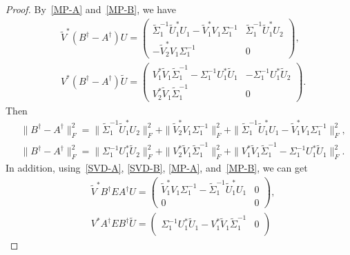 \documentclass[11pt]{article}
\begin{document}
\begin{proof}
By~\eqref{MP-A} and~\eqref{MP-B}, we have
\begin{align*}
&\widetilde{V}^{\ast}(B^{\dagger}-A^{\dagger})U=\begin{pmatrix}
\widetilde{\Sigma}_{1}^{-1}\widetilde{U}_{1}^{\ast}U_{1}-\widetilde{V}_{1}^{\ast}V_{1}\Sigma_{1}^{-1} & \widetilde{\Sigma}_{1}^{-1}\widetilde{U}_{1}^{\ast}U_{2} \\
-\widetilde{V}_{2}^{\ast}V_{1}\Sigma_{1}^{-1} & 0
\end{pmatrix},\\
&V^{\ast}(B^{\dagger}-A^{\dagger})\widetilde{U}=\begin{pmatrix}
V_{1}^{\ast}\widetilde{V}_{1}\widetilde{\Sigma}_{1}^{-1}-\Sigma_{1}^{-1}U_{1}^{\ast}\widetilde{U}_{1} & -\Sigma_{1}^{-1}U_{1}^{\ast}\widetilde{U}_{2} \\
V_{2}^{\ast}\widetilde{V}_{1}\widetilde{\Sigma}_{1}^{-1}  & 0
\end{pmatrix}.
\end{align*}
Then
\begin{subequations}
\begin{align}
&\|B^{\dagger}-A^{\dagger}\|_{F}^{2}=\|\widetilde{\Sigma}_{1}^{-1}\widetilde{U}_{1}^{\ast}U_{2}\|_{F}^{2}+\|\widetilde{V}_{2}^{\ast}V_{1}\Sigma_{1}^{-1}\|_{F}^{2}+\|\widetilde{\Sigma}_{1}^{-1}\widetilde{U}_{1}^{\ast}U_{1}-\widetilde{V}_{1}^{\ast}V_{1}\Sigma_{1}^{-1}\|_{F}^{2},\label{rela1.1}\\
&\|B^{\dagger}-A^{\dagger}\|_{F}^{2}=\|\Sigma_{1}^{-1}U_{1}^{\ast}\widetilde{U}_{2}\|_{F}^{2}+\|V_{2}^{\ast}\widetilde{V}_{1}\widetilde{\Sigma}_{1}^{-1}\|_{F}^{2}+\|V_{1}^{\ast}\widetilde{V}_{1}\widetilde{\Sigma}_{1}^{-1}-\Sigma_{1}^{-1}U_{1}^{\ast}\widetilde{U}_{1}\|_{F}^{2}.\label{rela1.2}
\end{align}
\end{subequations}
In addition, using~\eqref{SVD-A}, \eqref{SVD-B}, \eqref{MP-A}, and~\eqref{MP-B}, we can get
\begin{align*}
&\widetilde{V}^{\ast}B^{\dagger}EA^{\dagger}U=\begin{pmatrix}
\widetilde{V}_{1}^{\ast}V_{1}\Sigma_{1}^{-1}-\widetilde{\Sigma}_{1}^{-1}\widetilde{U}_{1}^{\ast}U_{1} & 0 \\
0 & 0
\end{pmatrix},\\
&V^{\ast}A^{\dagger}EB^{\dagger}\widetilde{U}=\begin{pmatrix}
\Sigma_{1}^{-1}U_{1}^{\ast}\widetilde{U}_{1}-V_{1}^{\ast}\widetilde{V}_{1}\widetilde{\Sigma}_{1}^{-1} & 0 \\

\end{pmatrix}
\end{align*}
\end{proof}
\end{document}
